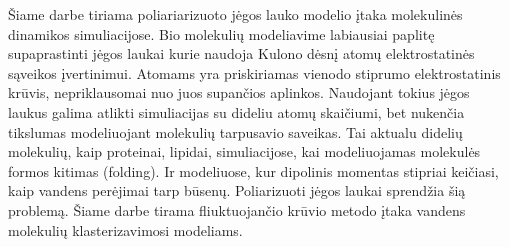 Šiame darbe tiriama poliariarizuoto jėgos lauko modelio įtaka molekulinės dinamikos simuliacijose.
Bio molekulių modeliavime labiausiai paplitę supaprastinti jėgos laukai kurie naudoja Kulono dėsnį atomų elektrostatinės sąveikos įvertinimui.
Atomams yra priskiriamas vienodo stiprumo elektrostatinis krūvis, nepriklausomai nuo juos supančios aplinkos.
Naudojant tokius jėgos laukus galima atlikti simuliacijas su dideliu atomų skaičiumi, bet nukenčia tikslumas modeliuojant molekulių tarpusavio saveikas.
Tai aktualu didelių molekulių, kaip proteinai, lipidai, simuliacijose, kai modeliuojamas molekulės formos kitimas (folding).
Ir modeliuose, kur dipolinis momentas stipriai keičiasi, kaip vandens perėjimai tarp būsenų.
Poliarizuoti jėgos laukai sprendžia šią problemą.
Šiame darbe tirama fliuktuojančio krūvio metodo įtaka vandens molekulių klasterizavimosi modeliams.
